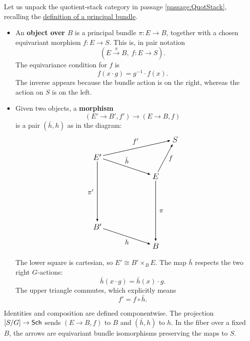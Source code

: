 \documentclass[12pt]{memoir}
\newcounter{passage}
\begin{document}
\begin{ptcb}
    Let us unpack the quotient-stack category in passage
    \ref{passage:QuotStack}, recalling the
    \hyperref[def:PrincipalBundle]{definition of a principal bundle}.
    \begin{itemize}
        \item An \textbf{object over \(B\)} is a principal bundle \(\pi:E\to B\), together with a chosen equivariant
        morphism \(f:E\to S\). This is, in pair notation
        \[
            (E\xrightarrow{\pi}B,\ f:E\to S).
        \]
        The equivariance condition for \(f\) is
        \[
            f(x\cdot g)=g^{-1}\cdot f(x).
        \]
        The inverse appears because the bundle action is on the right,
        whereas the action on \(S\) is on the left.
        \item Given two objects, a \textbf{morphism}
        \[
            (E'\to B',f')\longrightarrow(E\to B,f)
        \]
        is a pair \((\bar h,h)\) as in the diagram:
        \[
        \begin{tikzpicture}[
            arrows={-{Latex[length=1.6mm]}},
            line width=.6pt,
            every node/.style={inner sep=2pt,font=\large}
        ]
            \node (Ep) at (0,3)     {$E'$};
            \node (E)  at (3,2)     {$E$};
            \node (Bp) at (0,-.6)   {$B'$};
            \node (B)  at (3,-1.6)  {$B$};
            \node (S)  at (4,3.9)   {$S$};

            \begin{scope}[every node/.append style={font=\normalsize}]
            \draw (Ep) -- node[midway,above,yshift=.25em] {$\bar h$} (E);
            \draw (Ep) -- node[midway,left,xshift=-.3em] {$\pi'$} (Bp);
            \draw (E)  -- node[midway,right,xshift=.3em] {$\pi$} (B);
            \draw (Bp) -- node[midway,below,yshift=-.25em] {$h$} (B);
            \draw (Ep) -- node[pos=.48,above,yshift=.3em] {$f'$} (S);
            \draw (E)  -- node[pos=.48,right,xshift=.3em] {$f$} (S);
            \end{scope}
        \end{tikzpicture}
        \]
        The lower square is cartesian, so
        \(E'\cong B'\times_B E\).
        The map \(\bar h\) respects the two right \(G\)-actions:
        \[
            \bar h(x\cdot g)=\bar h(x)\cdot g.
        \]
        The upper triangle commutes, which explicitly means
        \[
            f'=f\circ\bar h.
        \]
    \end{itemize}
    Identities and composition are defined componentwise. The projection
    \([S/G]\to\mathsf{Sch}\) sends \((E\to B,f)\) to \(B\) and
    \((\bar h,h)\) to \(h\). In the fiber over a fixed \(B\), the
    arrows are equivariant bundle isomorphisms preserving the maps to \(S\).
\end{ptcb}
\end{document}
